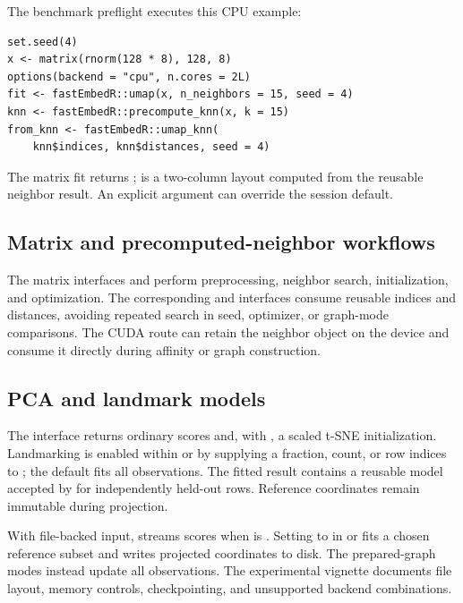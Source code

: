 \documentclass[article]{jss}
\begin{document}
The benchmark preflight executes this CPU example:
\begin{verbatim}
set.seed(4)
x <- matrix(rnorm(128 * 8), 128, 8)
options(backend = "cpu", n.cores = 2L)
fit <- fastEmbedR::umap(x, n_neighbors = 15, seed = 4)
knn <- fastEmbedR::precompute_knn(x, k = 15)
from_knn <- fastEmbedR::umap_knn(
    knn$indices, knn$distances, seed = 4)
\end{verbatim}
The matrix fit returns ;  is a
two-column layout computed from the reusable neighbor result. An explicit
 argument can override the session default.

\subsection{Matrix and precomputed-neighbor workflows}

The matrix interfaces  and  perform preprocessing,
neighbor search, initialization, and optimization. The corresponding
 and  interfaces consume reusable indices
and distances, avoiding repeated search in seed, optimizer, or graph-mode
comparisons. The CUDA route can retain the neighbor object on the device and
consume it directly during affinity or graph construction.

\subsection{PCA and landmark models}

The  interface returns ordinary scores and, with
, a scaled t-SNE initialization. Landmarking is enabled
within  or  by supplying a fraction, count, or row
indices to ; the default  fits all observations.
The fitted result contains a reusable model accepted by
 for independently held-out rows. Reference
coordinates remain immutable during projection.

With file-backed input,  streams scores when 
is . Setting  to  in
 or  fits a chosen reference subset and writes
projected coordinates to disk. The prepared-graph modes instead update
all observations. The experimental vignette documents file layout,
memory controls, checkpointing, and unsupported backend combinations.
\end{document}
